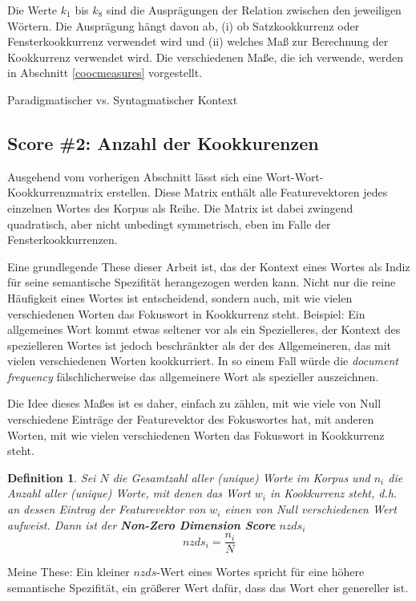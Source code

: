 \documentclass[11pt,numbers=noenddot]{scrartcl}
\newtheorem*{defi}{Definition}
\begin{document}
Die Werte $k_1$ bis $k_8$ sind die Ausprägungen der Relation zwischen den jeweiligen Wörtern. Die Ausprägung hängt davon ab, (i) ob Satzkookkurrenz oder Fensterkookkurrenz verwendet wird und (ii) welches Maß zur Berechnung der Kookkurrenz verwendet wird. Die verschiedenen Maße, die ich verwende, werden in Abschnitt \ref{coocmeasures} vorgestellt.

Paradigmatischer vs. Syntagmatischer Kontext

\subsection{Score \#2: Anzahl der Kookkurenzen}

Ausgehend vom vorherigen Abschnitt lässt sich eine Wort-Wort-Kookkurrenzmatrix erstellen. Diese Matrix enthält alle Featurevektoren jedes einzelnen Wortes des Korpus als Reihe. Die Matrix ist dabei zwingend quadratisch, aber nicht unbedingt symmetrisch, eben im Falle der Fensterkookkurrenzen.

Eine grundlegende These dieser Arbeit ist, das der Kontext eines Wortes als Indiz für seine semantische Spezifität herangezogen werden kann. Nicht nur die reine Häufigkeit eines Wortes ist entscheidend, sondern auch, mit wie vielen verschiedenen Worten das Fokuswort in Kookkurrenz steht. Beispiel: Ein allgemeines Wort kommt etwas seltener vor als ein Spezielleres, der Kontext des spezielleren Wortes ist jedoch beschränkter als der des Allgemeineren, das mit vielen verschiedenen Worten kookkurriert. In so einem Fall würde die \emph{document frequency} fälschlicherweise das allgemeinere Wort als spezieller auszeichnen.

Die Idee dieses Maßes ist es daher, einfach zu zählen, mit wie viele von Null verschiedene Einträge der Featurevektor des Fokuswortes hat, mit anderen Worten, mit wie vielen verschiedenen Worten das Fokuswort in Kookkurrenz steht.

\begin{defi}
Sei $N$ die Gesamtzahl aller (unique) Worte im Korpus und $n_i$ die Anzahl aller (unique) Worte, mit denen das Wort $w_i$ in Kookkurrenz steht, d.h. an dessen Eintrag der Featurevektor von $w_i$ einen von Null verschiedenen Wert aufweist. Dann ist der \textbf{Non-Zero Dimension Score} $nzds_i$
\begin{equation}
    nzds_i = \frac{n_i}{N}
\end{equation}
\end{defi}

Meine These: Ein kleiner $nzds$-Wert eines Wortes spricht für eine höhere semantische Spezifität, ein größerer Wert dafür, dass das Wort eher genereller ist.
\end{document}
